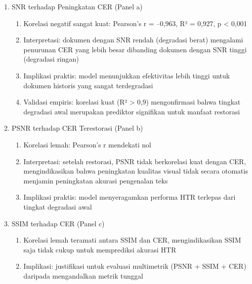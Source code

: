 \documentclass[12pt,a4paper]{article}
\begin{document}
\begin{enumerate}[leftmargin=1.5em, labelsep=0.5em, itemindent=0pt, label=\arabic*., topsep=0pt, partopsep=0pt]
    \item SNR terhadap Peningkatan CER (Panel a)
    
    \begin{enumerate}[leftmargin=1.5em, labelsep=0.5em, itemindent=0pt, noitemsep, topsep=0pt, label=\alph*)]
        \item Korelasi negatif sangat kuat: Pearson's r = --0,963, R² = 0,927, p < 0,001
        \item Interpretasi: dokumen dengan SNR rendah (degradasi berat) mengalami penurunan CER yang lebih besar dibanding dokumen dengan SNR tinggi (degradasi ringan)
        \item Implikasi praktis: model menunjukkan efektivitas lebih tinggi untuk dokumen historis yang sangat terdegradasi
        \item Validasi empiris: korelasi kuat (R² > 0,9) mengonfirmasi bahwa tingkat degradasi awal merupakan prediktor signifikan untuk manfaat restorasi
    \end{enumerate}

    \item PSNR terhadap CER Terestorasi (Panel b)
    
    \begin{enumerate}[leftmargin=1.5em, labelsep=0.5em, itemindent=0pt, noitemsep, topsep=0pt, label=\alph*)]
        \item Korelasi lemah: Pearson's r mendekati nol
        \item Interpretasi: setelah restorasi, PSNR tidak berkorelasi kuat dengan CER, mengindikasikan bahwa peningkatan kualitas visual tidak secara otomatis menjamin peningkatan akurasi pengenalan teks
        \item Implikasi praktis: model menyeragamkan performa HTR terlepas dari tingkat degradasi awal
    \end{enumerate}

    \item SSIM terhadap CER (Panel c)
    
    \begin{enumerate}[leftmargin=1.5em, labelsep=0.5em, itemindent=0pt, noitemsep, topsep=0pt, label=\alph*)]
        \item Korelasi lemah teramati antara SSIM dan CER, mengindikasikan SSIM saja tidak cukup untuk memprediksi akurasi HTR
        \item Implikasi: justifikasi untuk evaluasi multimetrik (PSNR + SSIM + CER) daripada mengandalkan metrik tunggal
    \end{enumerate}


\end{enumerate}
\end{document}
